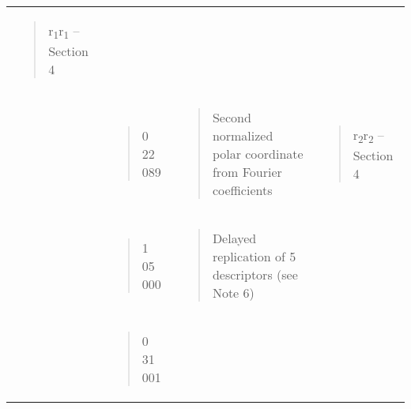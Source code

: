 \begin{longtable}[]{@{}llll@{}}
\begin{minipage}[t]{0.22\columnwidth}
\begin{quote}
r\textsubscript{1}r\textsubscript{1} -- Section 4
\end{quote}\strut
\end{minipage}\tabularnewline
\begin{minipage}[t]{0.22\columnwidth}\raggedright
\strut
\end{minipage} & \begin{minipage}[t]{0.22\columnwidth}\raggedright
\begin{quote}
0 22 089
\end{quote}\strut
\end{minipage} & \begin{minipage}[t]{0.22\columnwidth}\raggedright
\begin{quote}
Second normalized polar coordinate from Fourier coefficients
\end{quote}\strut
\end{minipage} & \begin{minipage}[t]{0.22\columnwidth}\raggedright
\begin{quote}
r\textsubscript{2}r\textsubscript{2} -- Section 4
\end{quote}\strut
\end{minipage}\tabularnewline
\begin{minipage}[t]{0.22\columnwidth}\raggedright
\strut
\end{minipage} & \begin{minipage}[t]{0.22\columnwidth}\raggedright
\begin{quote}
1 05 000
\end{quote}\strut
\end{minipage} & \begin{minipage}[t]{0.22\columnwidth}\raggedright
\begin{quote}
Delayed replication of 5 descriptors (see Note 6)
\end{quote}\strut
\end{minipage} & \begin{minipage}[t]{0.22\columnwidth}\raggedright
\strut
\end{minipage}\tabularnewline
\begin{minipage}[t]{0.22\columnwidth}\raggedright
\strut
\end{minipage} & \begin{minipage}[t]{0.22\columnwidth}\raggedright
\begin{quote}
0 31 001
\end{quote}\strut
\end{minipage} & \begin{minipage}[t]{0.22\columnwidth}\raggedright

\end{minipage}
\end{longtable}
